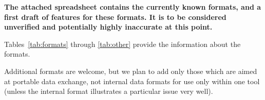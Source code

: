 \documentclass{sig-alternate}
\begin{document}
{\bf The attached spreadsheet contains the currently known formats,
  and a first draft of features for these formats. It is to be
  considered unverified and potentially highly inaccurate at this
  point.}

Tables~\ref{tab:formats} through \ref{tab:other} provide the
information about the formats.

Additional formats are welcome, but we plan to add only those which
are aimed at portable data exchange, not internal data formats for use
only within one tool (unless the internal format illustrates a
particular issue very well).



\begin{table*}[p]
  \centering
  {\small
    \begin{tabular}{rrrllp{20mm}}
      
      \hline
       
    \end{tabular} 
  }
  \caption{The format list.}
  \label{tab:formats}
\end{table*}


\begin{table*}[p]
  \centering
  {\small
    \begin{tabular}{r|llllp{12mm}p{15mm}p{17mm}}
      
      \hline
       
    \end{tabular} 
  }
  \caption{File types.}
  \label{tab:file_types}
\end{table*}
\end{document}
